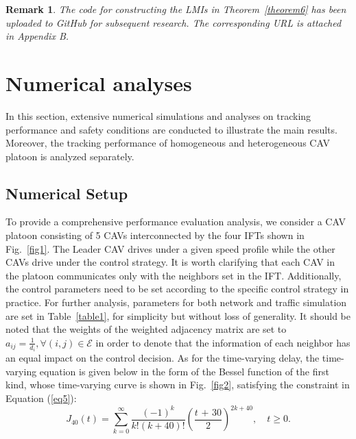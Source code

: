 \documentclass[a4paper]{cas-sc}
\newtheorem{remark}[theorem]{Remark}
\begin{document}
\begin{remark}
  \label{remark7}
  The code for constructing the LMIs in Theorem~\ref{theorem6} has been uploaded to GitHub for subsequent research. The corresponding URL is attached in Appendix B.
\end{remark}

\section{Numerical analyses}
\label{Section 5}
In this section, extensive numerical simulations and analyses on tracking performance and safety conditions are conducted to illustrate the main results. Moreover, the tracking performance of homogeneous and heterogeneous CAV platoon is analyzed separately.

\subsection{Numerical Setup}
\label{Section 5.1}
To provide a comprehensive performance evaluation analysis, we consider a CAV platoon consisting of 5 CAVs interconnected by the four IFTs shown in Fig.~\ref{fig1}. The Leader CAV drives under a given speed profile while the other CAVs drive under the control strategy. It is worth clarifying that each CAV in the platoon communicates only with the neighbors set in the IFT. Additionally, the control parameters need to be set according to the specific control strategy in practice. For further analysis, parameters for both network and traffic simulation are set in Table~\ref{table1}, for simplicity but without loss of generality. It should be noted that the weights of the weighted adjacency matrix are set to $ {a_{ij}} = \frac{1}{{{d_i}}},\forall (i,j) \in \mathcal{E} $ in order to denote that the information of each neighbor has an equal impact on the control decision. As for the time-varying delay, the time-varying equation is given below in the form of the Bessel function of the first kind, whose time-varying curve is shown in Fig.~\ref{fig2}, satisfying the constraint in Equation (\ref{eq5}):
\begin{equation}
  \label{eq51}
  {J_{40}}(t) = \sum\limits_{k = 0}^\infty  {\frac{{{{( - 1)}^k}}}{{k!(k + 40)!}}} {\left( {\frac{{t{\text{ + }}30}}{2}} \right)^{2k + 40}},\quad t \geqslant 0.
\end{equation}
\end{document}
